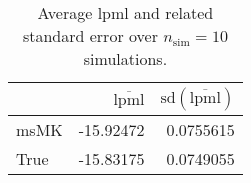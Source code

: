 \begin{table}[H]

\caption{Average lpml and related standard error over $n_{\text{sim}} = 10$ simulations.}
\centering
\begin{tabular}[t]{lrr}
\toprule
  & $\overbar{\text{lpml}}$ & $\text{sd}(\overbar{\text{lpml}})$\\
\midrule
msMK & -15.92472 & 0.0755615\\
True & -15.83175 & 0.0749055\\
\bottomrule
\end{tabular}
\end{table}